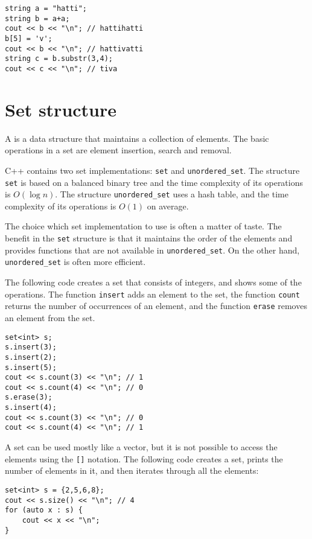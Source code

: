 \begin{lstlisting}
string a = "hatti";
string b = a+a;
cout << b << "\n"; // hattihatti
b[5] = 'v';
cout << b << "\n"; // hattivatti
string c = b.substr(3,4);
cout << c << "\n"; // tiva
\end{lstlisting}

\section{Set structure}


A  is a data structure that
maintains a collection of elements.
The basic operations in a set are element
insertion, search and removal.

C++ contains two set implementations:
\texttt{set} and \texttt{unordered\_set}.
The structure \texttt{set} is based on a balanced
binary tree and the time complexity of its
operations is $O(\log n)$.
The structure \texttt{unordered\_set} uses a hash table,
and the time complexity of its operations is $O(1)$ on average.

The choice which set implementation to use
is often a matter of taste.
The benefit in the \texttt{set} structure
is that it maintains the order of the elements
and provides functions that are not available
in \texttt{unordered\_set}.
On the other hand, \texttt{unordered\_set} is
often more efficient.

The following code creates a set
that consists of integers,
and shows some of the operations.
The function \texttt{insert} adds an element to the set,
the function \texttt{count} returns the number of occurrences
of an element,
and the function \texttt{erase} removes an element from the set.

\begin{lstlisting}
set<int> s;
s.insert(3);
s.insert(2);
s.insert(5);
cout << s.count(3) << "\n"; // 1
cout << s.count(4) << "\n"; // 0
s.erase(3);
s.insert(4);
cout << s.count(3) << "\n"; // 0
cout << s.count(4) << "\n"; // 1
\end{lstlisting}

A set can be used mostly like a vector,
but it is not possible to access
the elements using the \texttt{[]} notation.
The following code creates a set,
prints the number of elements in it, and then
iterates through all the elements:
\begin{lstlisting}
set<int> s = {2,5,6,8};
cout << s.size() << "\n"; // 4
for (auto x : s) {
    cout << x << "\n";
}
\end{lstlisting}

